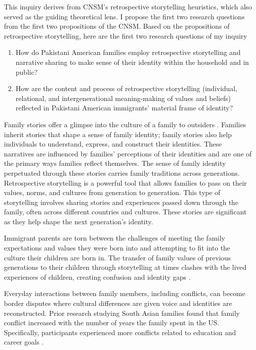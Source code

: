 This inquiry derives from CNSM’s retrospective storytelling heuristics, which also served as the guiding theoretical lens. I propose the first two research questions from the first two propositions of the CNSM. Based on the propositions of retrospective storytelling, here are the first two research questions of my inquiry 

\begin{enumerate}
    \item How do Pakistani American families employ retrospective storytelling and narrative sharing to make sense of their identity within the household and in public?
    \item How are the content and process of retrospective storytelling (individual, relational, and intergenerational meaning-making of values and beliefs) reflected in Pakistani American immigrants’ material frame of identity?
\end{enumerate}

Family stories offer a glimpse into the culture of a family to outsiders \citep{koenigkellasFamilyStoriesStorytelling2012}. Families inherit stories that shape a sense of family identity; family stories also help individuals to understand, express, and construct their identities. These narratives are influenced by families' perceptions of their identities and are one of the primary ways families reflect themselves. The sense of family identity perpetuated through these stories carries family traditions across generations. Retrospective storytelling is a powerful tool that allows families to pass on their values, norms, and cultures from generation to generation. This type of storytelling involves sharing stories and experiences passed down through the family, often across different countries and cultures. These stories are significant as they help shape the next generation's identity. 

Immigrant parents are torn between the challenges of meeting the family expectations and values they were born into and attempting to fit into the culture their children are born in. The transfer of family values of previous generations to their children through storytelling at times clashes with the lived experiences of children, creating confusion and identity gaps \citep{barclayFamilyMemoryIdentity2021, koenigkellasCommunicatedNarrativeSenseMaking2022, koenigkellasFamilyStoriesStorytelling2012}.

Everyday interactions between family members, including conflicts, can become border disputes where cultural differences are given voice and identities are reconstructed. Prior research studying South Asian families found that family conflict increased with the number of years the family spent in the US. Specifically, participants experienced more conflicts related to education and career goals \citep{onayLivingClashSecular2023, kaliaBufferingParentchildConflict2022, giguereLivingCrossroadsCultural2010}.

